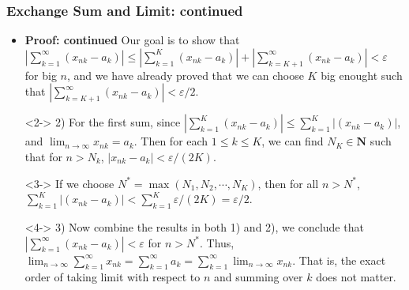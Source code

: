 \documentclass[handout]{beamer}
\begin{document}
\frame
{
  \frametitle{Exchange Sum and Limit: continued}

   \begin{itemize}
   
 
  \item<1-> \textbf{Proof: continued} Our goal is to show that $ |\sum_{k=1}^{\infty} ( x_{nk}- a_k)|  \leq |\sum_{k=1}^{K} ( x_{nk}- a_k) |+|\sum_{k=K+1}^{\infty} ( x_{nk}- a_k)| <\varepsilon $ for big $n$, and we have already proved that we can choose $K$ big enought such that $|\sum_{k=K+1}^{\infty} ( x_{nk}- a_k)|<\varepsilon/2$. 
  
  
     \item[]<2-> 2) For the first sum, since $ |\sum_{k=1}^{K} ( x_{nk}- a_k)| \leq  \sum_{k=1}^{K} |( x_{nk}- a_k)|$, and $\lim_{n\rightarrow \infty} x_{nk}=a_k$. Then for each $1\leq k\leq K$, we can find $N_K \in \mathbf{N}$ such that for $n>N_k$, $|x_{nk}-a_k|<\varepsilon/(2K)$.
     
       \item[]<3->  If we choose $N^*=\max(N_1,N_2,\cdots, N_K)$, then for all $n>N^*$, $\sum_{k=1}^{K} |( x_{nk}- a_k)|<\sum_{k=1}^K \varepsilon/(2K) =\varepsilon/2$.
     
       \item[]<4-> 3)  Now combine the results in both 1) and 2), we conclude that  $ |\sum_{k=1}^{\infty} ( x_{nk}- a_k)| <\varepsilon$ for $n>N^*$. Thus, $\lim_{n\rightarrow \infty } \sum_{k=1}^{\infty} x_{nk}=\sum_{k=1}^{\infty} a_k= \sum_{k=1}^{\infty} \lim_{n\rightarrow \infty } x_{nk}$. That is, the exact order of taking limit with respect to $n$ and summing over $k$ does not matter. 
        
       
  \end{itemize}
}
\end{document}

